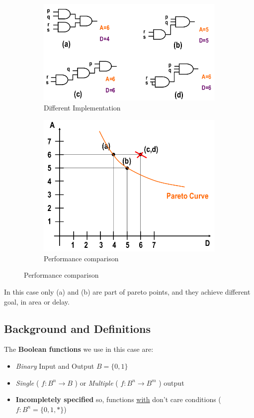 \begin{figure}[H]
	\centering
	\begin{subfigure}[b]{0.5\textwidth}
		\includegraphics[width=\textwidth]{./Cap6/Images/Image1.png}
		\caption{Different Implementation}
		\label{fig:possImpl}
	\end{subfigure}
	\quad\quad
	\begin{subfigure}[b]{0.4\textwidth}
		\includegraphics[width=\textwidth]{./Cap6/Images/Image2.png}
		\caption{Performance comparison}
		\label{fig:perform}
	\end{subfigure}
\end{figure}
In this case only (a) and (b) are part of pareto points, and they achieve different goal, in area or delay.

\subsection{Background and Definitions}
The \textbf{Boolean functions} we use in this case are:
\begin{itemize}
	\item \textit{Binary} Input and Output $ B = \{0, 1\} $ 
	\item \textit{Single} ( $ f : B^{n} \rightarrow B $ ) or\textit{ Multiple} (  $ f : B^{n} \rightarrow B^{m} $ ) output
	\item \textbf{Incompletely specified} so, functions \underline{with} don't care conditions ($ f: B^{n} = \{0, 1, *\} $)
\end{itemize}
